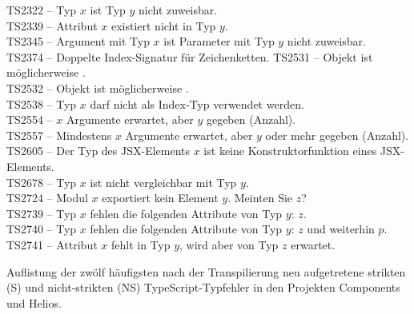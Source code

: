 \begin{table}[p]
{    TS2322 -- Typ $x$ ist Typ $y$ nicht zuweisbar.\\
    TS2339 -- Attribut $x$ existiert nicht in Typ $y$.\\
    TS2345 -- Argument mit Typ $x$ ist Parameter mit Typ $y$ nicht zuweisbar.\\
    TS2374 -- Doppelte Index-Signatur für Zeichenketten.
    TS2531 -- Objekt ist möglicherweise .\\
    TS2532 -- Objekt ist möglicherweise .\\
    TS2538 -- Typ $x$ darf nicht als Index-Typ verwendet werden.\\
    TS2554 -- $x$ Argumente erwartet, aber $y$ gegeben (Anzahl).\\
    TS2557 -- Mindestens $x$ Argumente erwartet, aber $y$ oder mehr gegeben (Anzahl).\\
    TS2605 -- Der Typ des JSX-Elements $x$ ist keine Konstruktorfunktion eines JSX-Elements.\\
    TS2678 -- Typ $x$ ist nicht vergleichbar mit Typ $y$.\\
    TS2724 -- Modul $x$ exportiert kein Element $y$. Meinten Sie $z$?\\
    TS2739 -- Typ $x$ fehlen die folgenden Attribute von Typ $y$: $z$.\\
    TS2740 -- Typ $x$ fehlen die folgenden Attribute von Typ $y$: $z$ und weiterhin $p$.\\
    TS2741 -- Attribut $x$ fehlt in Typ $y$, wird aber von Typ $z$ erwartet.\\
  }
  \vspace{\baselineskip}
  \caption{Auflistung der zwölf häufigsten nach der Transpilierung neu aufgetretene strikten (S) und nicht-strikten (NS) TypeScript-Typfehler in den Projekten Components und Helios.}
  \label{tab:type-errors}
\end{table}
